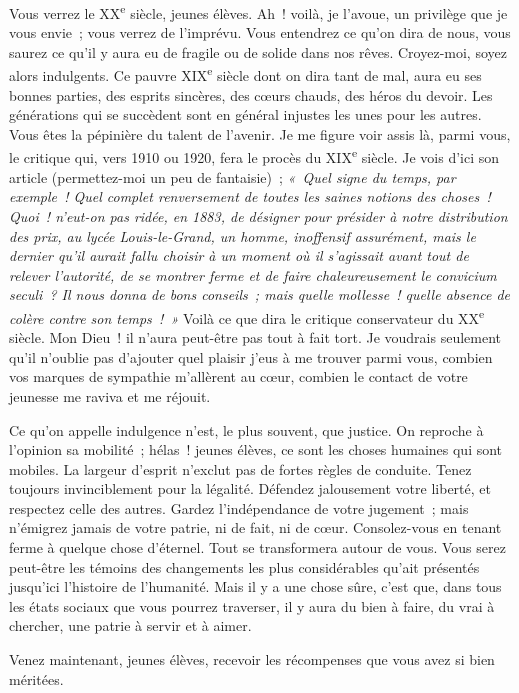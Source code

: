 \documentclass[french,twoside]{book} %
\newcommand\orgName[1]{#1}
\begin{document}
Vous verrez le XX\textsuperscript{e} siècle, jeunes élèves. Ah ! voilà, je l’avoue, un privilège que je vous envie ; vous verrez de l’imprévu. Vous entendrez ce qu’on dira de nous, vous saurez ce qu’il y aura eu de fragile ou de solide dans nos rêves. Croyez-moi, soyez alors indulgents. Ce pauvre XIX\textsuperscript{e} siècle dont on dira tant de mal, aura eu ses bonnes parties, des esprits sincères, des cœurs chauds, des héros du devoir. Les générations qui se succèdent sont en général injustes les unes pour les autres. Vous êtes la pépinière du talent de l’avenir. Je me figure voir assis là, parmi vous, le critique qui, vers 1910 ou 1920, fera le procès du XIX\textsuperscript{e} siècle. Je vois d’ici son article (permettez-moi un peu de fantaisie) ; \emph{« Quel signe du temps, par exemple ! Quel complet renversement de toutes les saines notions des choses ! Quoi ! n’eut-on pas ridée, en 1883, de désigner pour présider à notre distribution des prix, au {\orgName lycée Louis-le-Grand}, un homme, inoffensif assurément, mais le dernier qu’il aurait fallu choisir à un moment où il s’agissait avant tout de relever l’autorité, de se montrer ferme et de faire chaleureusement le convicium seculi ? Il nous donna de bons conseils ; mais quelle mollesse ! quelle absence de colère contre son temps ! »} Voilà ce que dira le critique conservateur du XX\textsuperscript{e} siècle. Mon Dieu ! il n’aura peut-être pas tout à fait tort. Je voudrais seulement qu’il n’oublie pas d’ajouter quel plaisir j’eus à me trouver parmi vous, combien vos marques de sympathie m’allèrent au cœur, combien le contact de votre jeunesse me raviva et me réjouit.\par
Ce qu’on appelle indulgence n’est, le plus souvent, que justice. On reproche à l’opinion sa mobilité ; hélas ! jeunes élèves, ce sont les choses humaines qui sont mobiles. La largeur d’esprit n’exclut pas de fortes règles de conduite. Tenez toujours invinciblement pour la légalité. Défendez jalousement votre liberté, et respectez celle des autres. Gardez l’indépendance de votre jugement ; mais n’émigrez jamais de votre patrie, ni de fait, ni de cœur. Consolez-vous en tenant ferme à quelque chose d’éternel. Tout se transformera autour de vous. Vous serez peut-être les témoins des changements les plus considérables qu’ait présentés jusqu’ici l’histoire de l’humanité. Mais il y a une chose sûre, c’est que, dans tous les états sociaux que vous pourrez traverser, il y aura du bien à faire, du vrai à chercher, une patrie à servir et à aimer.\par
Venez maintenant, jeunes élèves, recevoir les récompenses que vous avez si bien méritées.
\end{document}
